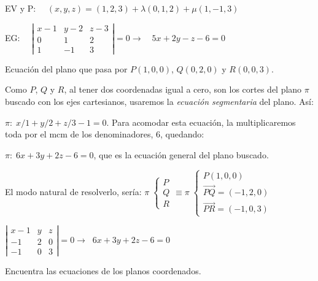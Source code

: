 \begin{proofw}\renewcommand{\qedsymbol}{$\diamond$}
EV y P: $\quad (x,y,z)=(1,2,3)+\lambda (0,1,2)+\mu (1,-1,3)$

\noindent EG: $\quad \left| \begin{matrix} x-1&y-2&z-3\\0&1&2\\1&-1&3 \end{matrix} \right|=0 \to \quad 5x+2y-z-6=0$

\end{proofw}

\begin{ejre}
Ecuación del plano que pasa por $P(1,0,0)$, $Q(0,2,0)$ y $R(0,0,3)$.	
\end{ejre}

\begin{proofw}\renewcommand{\qedsymbol}{$\diamond$}
Como $P$, $Q$ y $R$, al tener dos coordenadas igual a cero,  son los cortes del plano $\pi$ buscado con los ejes cartesianos, usaremos la \textit{ecuación segmentaria} del plano. Así:

\noindent $\pi:\; x/1+y/2+z/3-1=0$. Para acomodar esta ecuación, la multiplicaremos toda por el mcm de los denominadores, $6$, quedando:

\noindent $\pi:\; 6x+3y+2z-6=0$, que es la ecuación general del plano buscado.

\noindent \textcolor{gris}{El modo natural de resolverlo, sería:
$\pi\; \begin{cases} P\\Q\\R \end{cases} \equiv \pi\; \begin{cases} P(1,0,0)\\\overrightarrow{PQ}=(-1,2,0)\\ \overrightarrow{PR}=(-1,0,3) \end{cases}$}

\noindent \textcolor{gris}{$\left| \begin{matrix} x-1&y&z\\-1&2&0 \\ -1&0&3 \end{matrix} \right|=0 \to \; \; 6x+3y+2z-6=0 $}

\end{proofw}

\begin{ejre}
	Encuentra las ecuaciones de los planos coordenados.
\end{ejre}

